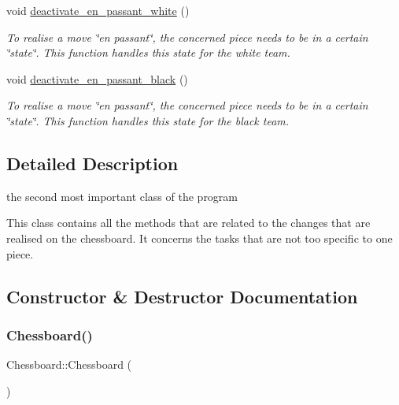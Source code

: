 \begin{DoxyCompactItemize}
\mbox{\label{classChessboard_a1061a56edf6eeb1185f9a538c5c2a065}} 
void \hyperlink{classChessboard_a1061a56edf6eeb1185f9a538c5c2a065}{deactivate\+\_\+en\+\_\+passant\+\_\+white} ()
\begin{DoxyCompactList}\small\item\em To realise a move \char`\"{}en passant\char`\"{}, the concerned piece needs to be in a certain \char`\"{}state\char`\"{}. This function handles this state for the white team. \end{DoxyCompactList}\item 
\mbox{\label{classChessboard_a7be80d7f0d3ea6ab343379a941e3cb5f}} 
void \hyperlink{classChessboard_a7be80d7f0d3ea6ab343379a941e3cb5f}{deactivate\+\_\+en\+\_\+passant\+\_\+black} ()
\begin{DoxyCompactList}\small\item\em To realise a move \char`\"{}en passant\char`\"{}, the concerned piece needs to be in a certain \char`\"{}state\char`\"{}. This function handles this state for the black team. \end{DoxyCompactList}\end{DoxyCompactItemize}


\subsection{Detailed Description}
the second most important class of the program 

This class contains all the methods that are related to the changes that are realised on the chessboard. It concerns the tasks that are not too specific to one piece. 

\subsection{Constructor \& Destructor Documentation}
\mbox{\label{classChessboard_a0647fd37fc04def4958a586c3d0100ab}} 
\subsubsection{\texorpdfstring{Chessboard()}{Chessboard()}}
{\footnotesize\ttfamily Chessboard\+::\+Chessboard (\begin{DoxyParamCaption}{ }\end{DoxyParamCaption})}



